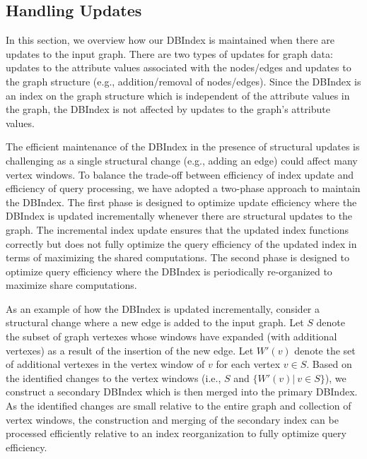 \subsection{Handling Updates}

In this section, we overview how our DBIndex is maintained when there are updates to the input graph.
There are two types of updates for graph data: updates to the attribute values associated with the nodes/edges and updates to the graph structure 
(e.g., addition/removal of nodes/edges).
Since the DBIndex is an index on the graph structure which is independent of the attribute values in the graph,
the DBIndex is not affected by updates to the graph's attribute values.

The efficient maintenance of the DBIndex in the presence of structural updates is challenging as a single structural change (e.g., adding an edge) could affect many vertex windows.  To balance the trade-off between efficiency of index update and efficiency of query processing, 
we have adopted a two-phase approach to maintain the DBIndex.
The first phase is designed to optimize update efficiency where the DBIndex is updated incrementally whenever there are structural updates to the graph.
The incremental index update ensures that the updated index functions correctly but does not fully optimize the query efficiency of the updated index
in terms of maximizing the shared computations.
The second phase is designed to optimize query efficiency where the DBIndex is periodically re-organized to maximize share computations.

As an example of how the DBIndex is updated incrementally, consider a structural change where a new edge is added to the input graph.
Let $S$ denote the subset of graph vertexes whose windows have expanded (with additional vertexes) as a result of the insertion of the new edge.
Let $W'(v)$ denote the set of additional vertexes in the vertex window of $v$ for each vertex $v \in S$.
Based on the identified changes to the vertex windows (i.e., $S$ and $\{W'(v) |\ v \in S\}$), 
we construct a secondary DBIndex which is then merged into the primary DBIndex.
As the identified changes are small relative to the entire graph and collection of vertex windows,
the construction and merging of the secondary index can be processed efficiently relative to an index reorganization to fully optimize query efficiency.
